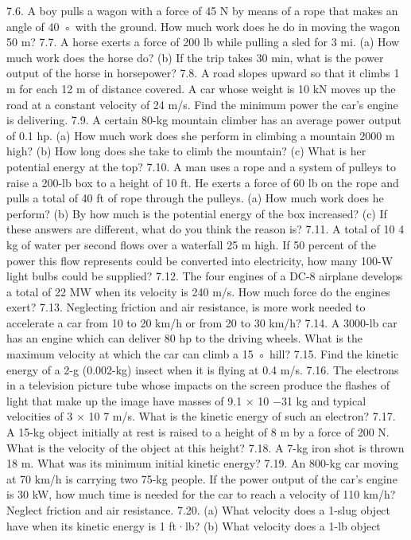 7.6. A boy pulls a wagon with a force of 45 N by means of a rope that makes an angle of 40 ◦ with the ground. How much
work does he do in moving the wagon 50 m?
7.7. A horse exerts a force of 200 lb while pulling a sled for 3 mi. (a) How much work does the horse do? (b) If the trip
takes 30 min, what is the power output of the horse in horsepower?
7.8. A road slopes upward so that it climbs 1 m for each 12 m of distance covered. A car whose weight is 10 kN moves
up the road at a constant velocity of 24 m/s. Find the minimum power the car’s engine is delivering.
7.9. A certain 80-kg mountain climber has an average power output of 0.1 hp. (a) How much work does she perform
in climbing a mountain 2000 m high? (b) How long does she take to climb the mountain? (c) What is her potential
energy at the top?
7.10. A man uses a rope and a system of pulleys to raise a 200-lb box to a height of 10 ft. He exerts a force of 60 lb on the
rope and pulls a total of 40 ft of rope through the pulleys. (a) How much work does he perform? (b) By how much is
the potential energy of the box increased? (c) If these answers are different, what do you think the reason is?
7.11. A total of 10 4 kg of water per second flows over a waterfall 25 m high. If 50 percent of the power this flow represents
could be converted into electricity, how many 100-W light bulbs could be supplied?
7.12. The four engines of a DC-8 airplane develops a total of 22 MW when its velocity is 240 m/s. How much force do the
engines exert?
7.13. Neglecting friction and air resistance, is more work needed to accelerate a car from 10 to 20 km/h or from 20 to
30 km/h?
7.14. A 3000-lb car has an engine which can deliver 80 hp to the driving wheels. What is the maximum velocity at which
the car can climb a 15 ◦ hill?
7.15. Find the kinetic energy of a 2-g (0.002-kg) insect when it is flying at 0.4 m/s.
7.16. The electrons in a television picture tube whose impacts on the screen produce the flashes of light that make up the
image have masses of 9.1 × 10 −31 kg and typical velocities of 3 × 10 7 m/s. What is the kinetic energy of such an
electron?
7.17. A 15-kg object initially at rest is raised to a height of 8 m by a force of 200 N. What is the velocity of the object at
this height?
7.18. A 7-kg iron shot is thrown 18 m. What was its minimum initial kinetic energy?
7.19. An 800-kg car moving at 70 km/h is carrying two 75-kg people. If the power output of the car’s engine is 30 kW, how
much time is needed for the car to reach a velocity of 110 km/h? Neglect friction and air resistance.
7.20. (a) What velocity does a 1-slug object have when its kinetic energy is 1 ft·lb? (b) What velocity does a 1-lb object

